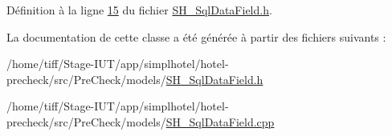 Définition à la ligne \hyperlink{SH__SqlDataField_8h_source_l00015}{15} du fichier \hyperlink{SH__SqlDataField_8h_source}{S\-H\-\_\-\-Sql\-Data\-Field.\-h}.



La documentation de cette classe a été générée à partir des fichiers suivants \-:\begin{DoxyCompactItemize}
\item 
/home/tiff/\-Stage-\/\-I\-U\-T/app/simplhotel/hotel-\/precheck/src/\-Pre\-Check/models/\hyperlink{SH__SqlDataField_8h}{S\-H\-\_\-\-Sql\-Data\-Field.\-h}\item 
/home/tiff/\-Stage-\/\-I\-U\-T/app/simplhotel/hotel-\/precheck/src/\-Pre\-Check/models/\hyperlink{SH__SqlDataField_8cpp}{S\-H\-\_\-\-Sql\-Data\-Field.\-cpp}\end{DoxyCompactItemize}

